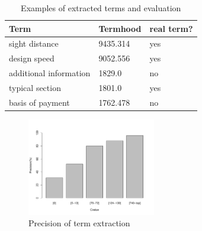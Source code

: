\documentclass[Journal, InsideFigs, DoubleSpace]{ascelike} %
\begin{document}
\begin{table} [t]
	\caption{Examples of extracted terms and evaluation}
	\label{table:term_evaluation}
	\centering
	\small
	\renewcommand{\arraystretch}{1.25}
	\begin{tabular}{l l l}
		\hline
		\textbf{Term} & \textbf{Termhood} & \textbf{real term?}\\
		\hline
		sight distance		& 9435.314 & yes\\
		design speed & 9052.556 & yes \\
		additional information & 1829.0 & no\\
		typical section & 1801.0  & yes\\
		basis of payment & 1762.478 & no\\
		\hline
	\end{tabular}
	
	\normalsize
\end{table}

\begin{figure}[t]
	\centering
	\includegraphics[width=0.5\textwidth]{Figure3_term_precision}
	\caption{Precision of term extraction}
	\label{fig:term_precision}
\end{figure}
\end{document}
